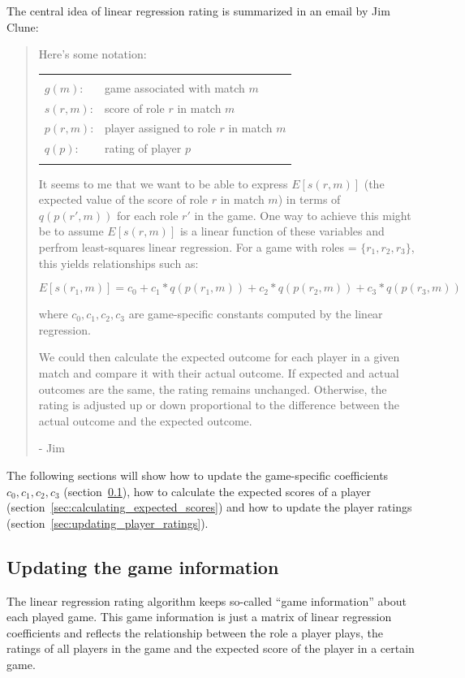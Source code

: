 \documentclass[a4paper,10pt]{article}
\begin{document}
The central idea of linear regression rating is summarized in an email by Jim Clune:
\begin{quotation}
Here's some notation:

\begin{tabular}{ll}
&\\
$g(m)$:    & game associated with match $m$ \\
$s(r, m)$: & score of role $r$ in match $m$ \\
$p(r, m)$: & player assigned to role $r$ in match $m$ \\
$q(p)$:    & rating of player $p$ \\
&
\end{tabular}

It seems to me that we want to be able to express $E[s(r, m)]$ (the
expected value of the score of role $r$ in match $m$) in terms of $q(p(r', m))$
for each role $r'$ in the game. One way to achieve this might be to assume
$E[s(r, m)]$ is a linear function of these variables and perfrom least-squares
linear regression. For a game with roles = $\{r_1, r_2, r_3\}$, this yields
relationships such as:

\[E[s(r_1, m)] = c_0 + c_1*q(p(r_1, m)) + c_2*q(p(r_2, m)) + c_3*q(p(r_3, m))\]

where $c_0, c_1, c_2, c_3$ are game-specific constants computed by the linear
regression.

We could then calculate the expected outcome for each player in a
given match and compare it with their actual outcome. If expected and
actual outcomes are the same, the rating remains unchanged.
Otherwise, the rating is adjusted up or down proportional to the
difference between the actual outcome and the expected outcome.

- Jim
\end{quotation}

The following sections will show how to update the game-specific coefficients $c_0, c_1, c_2, c_3$ (section~\ref{sec:updating_game_information}), how to calculate the expected scores of a player (section~\ref{sec:calculating_expected_scores}) and how to update the player ratings (section~\ref{sec:updating_player_ratings}).

\subsection{Updating the game information}
\label{sec:updating_game_information}

The linear regression rating algorithm keeps so-called ``game information'' about each played game. This game information is just a matrix of linear regression coefficients and reflects the relationship between the role a player plays, the ratings of all players in the game and the expected score of the player in a certain game.
\end{document}
